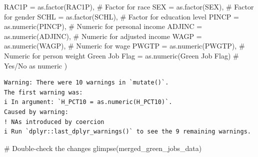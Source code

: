 \documentclass[
  letterpaper,
  DIV=11,
  numbers=noendperiod]{scrartcl}
\newenvironment{Shaded}{\begin{snugshade}}{\end{snugshade}}
\newcommand{\AttributeTok}[1]{\textcolor[rgb]{0.40,0.45,0.13}{#1}}
\newcommand{\CommentTok}[1]{\textcolor[rgb]{0.37,0.37,0.37}{#1}}
\newcommand{\FunctionTok}[1]{\textcolor[rgb]{0.28,0.35,0.67}{#1}}
\newcommand{\NormalTok}[1]{\textcolor[rgb]{0.00,0.23,0.31}{#1}}
\newcommand{\OtherTok}[1]{\textcolor[rgb]{0.00,0.23,0.31}{#1}}
\newcommand{\StringTok}[1]{\textcolor[rgb]{0.13,0.47,0.30}{#1}}
\begin{document}
\begin{Shaded}
\begin{Highlighting}[]
    \AttributeTok{RAC1P =} \FunctionTok{as.factor}\NormalTok{(RAC1P),  }\CommentTok{\# Factor for race}
    \AttributeTok{SEX =} \FunctionTok{as.factor}\NormalTok{(SEX),  }\CommentTok{\# Factor for gender}
    \AttributeTok{SCHL =} \FunctionTok{as.factor}\NormalTok{(SCHL),  }\CommentTok{\# Factor for education level}
    \AttributeTok{PINCP =} \FunctionTok{as.numeric}\NormalTok{(PINCP),  }\CommentTok{\# Numeric for personal income}
    \AttributeTok{ADJINC =} \FunctionTok{as.numeric}\NormalTok{(ADJINC),  }\CommentTok{\# Numeric for adjusted income}
    \AttributeTok{WAGP =} \FunctionTok{as.numeric}\NormalTok{(WAGP),  }\CommentTok{\# Numeric for wage}
    \AttributeTok{PWGTP =} \FunctionTok{as.numeric}\NormalTok{(PWGTP),  }\CommentTok{\# Numeric for person weight}
    \StringTok{\textasciigrave{}}\AttributeTok{Green Job Flag}\StringTok{\textasciigrave{}} \OtherTok{=} \FunctionTok{as.numeric}\NormalTok{(}\StringTok{\textasciigrave{}}\AttributeTok{Green Job Flag}\StringTok{\textasciigrave{}}\NormalTok{)  }\CommentTok{\# Yes/No as numeric}
\NormalTok{  )}
\end{Highlighting}
\end{Shaded}

\begin{verbatim}
Warning: There were 10 warnings in `mutate()`.
The first warning was:
i In argument: `H_PCT10 = as.numeric(H_PCT10)`.
Caused by warning:
! NAs introduced by coercion
i Run `dplyr::last_dplyr_warnings()` to see the 9 remaining warnings.
\end{verbatim}

\begin{Shaded}
\begin{Highlighting}[]
\CommentTok{\# Double{-}check the changes}
\FunctionTok{glimpse}\NormalTok{(merged\_green\_jobs\_data)}
\end{Highlighting}
\end{Shaded}
\end{document}
